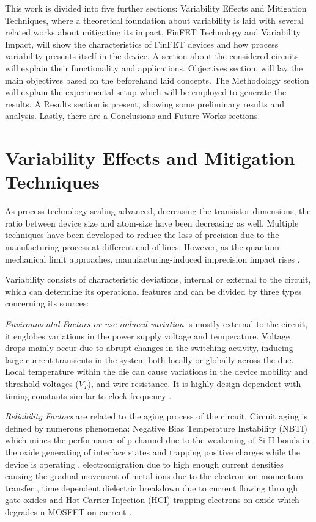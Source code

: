 \documentclass[pgmicro,mestrado,english]{iiufrgs}
\begin{document}
    This work is divided into five further sections: Variability Effects and Mitigation Techniques, where a theoretical foundation about variability is laid with several related works about mitigating its impact, FinFET Technology and Variability Impact, will show the characteristics of FinFET devices and how process variability presents itself in the device. A section about the considered circuits will explain their functionality and applications. Objectives section, will lay the main objectives based on the beforehand laid concepts. The Methodology section will explain the experimental setup which will be employed to generate the results. A Results section is present, showing some preliminary results and analysis. Lastly, there are a Conclusions and Future Works sections.

\chapter{Variability Effects and Mitigation Techniques}

As process technology scaling advanced, decreasing the transistor dimensions, the ratio between device size and atom-size have been decreasing as well. Multiple techniques have been developed to reduce the loss of precision due to the manufacturing process at different end-of-lines. However, as the quantum-mechanical limit approaches, manufacturing-induced imprecision impact rises \cite{asenov1999random}.

Variability consists of characteristic deviations, internal or external to the circuit, which can determine its operational features and can be divided by three types concerning its sources:

\textit{Environmental Factors or use-induced variation} is mostly external to the circuit, it englobes variations in the power supply voltage and temperature. Voltage drops mainly occur due to abrupt changes in the switching activity, inducing large current transients in the system both locally or globally across the due. Local temperature within the die can cause variations in the device mobility and threshold voltages ($V_T$), and wire resistance. It is highly design dependent with timing constants similar to clock frequency \cite{nassif:08} \cite{bernstein2006high}.

\textit{Reliability Factors} are related to the aging process of the circuit. Circuit aging is defined by numerous phenomena: Negative Bias Temperature Instability (NBTI) which mines the performance of p-channel due to the weakening of Si-H bonds in the oxide generating of interface states and trapping positive charges while the device is operating \cite{wang2008statistical}, electromigration due to high enough current densities causing the gradual movement of metal ions due to the electron-ion momentum transfer \cite{young1994failure}, time dependent dielectric breakdown due to current flowing through gate oxides \cite{lombardo2005dielectric} and Hot Carrier Injection (HCI) trapping electrons on oxide which degrades n-MOSFET on-current \cite{takeda1983empirical} \cite{nassif:08} \cite{bernstein2006high}.
\end{document}
